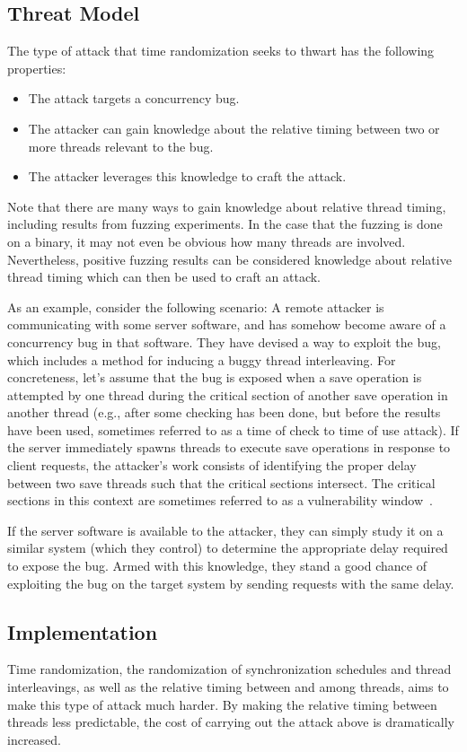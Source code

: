 \subsection{Threat Model}\label{threat-model}
The type of attack that time randomization seeks to thwart has the following properties:
\begin{itemize}
	\item The attack targets a concurrency bug.
	\item The attacker can gain knowledge about the relative timing between two
  or more threads relevant to the bug.
	\item The attacker leverages this knowledge to craft the attack.
\end{itemize}
Note that there are many ways to gain knowledge about relative thread timing, including results from fuzzing experiments.
In the case that the fuzzing is done on a binary, it may not even be obvious how many threads are involved.
Nevertheless, positive fuzzing results can be considered knowledge about relative thread timing which can then be used to craft an attack.

As an example, consider the following scenario:
A remote attacker is communicating with some server software, and has somehow become aware of a concurrency bug in that software.
They have devised a way to exploit the bug, which includes a method for inducing a buggy thread interleaving.
For concreteness, let's assume that the bug is exposed when a save operation
is attempted by one thread during the critical section of another save
operation in another thread (e.g., after some checking has been done, but before the results have been used, sometimes referred to as a time of check to time of use attack).
If the server immediately spawns threads to execute save operations in response to client requests, the attacker's work consists of identifying the proper delay between two save threads such that the critical sections intersect.
The critical sections in this context are sometimes referred to as a vulnerability window~\cite{Yang2012}.

If the server software is available to the attacker, they can simply study it on a similar system (which they control) to determine the appropriate delay required to expose the bug.
Armed with this knowledge, they stand a good chance of exploiting the bug on the target system by sending requests with the same delay.
\subsection{Implementation}\label{implementation}
Time randomization, the randomization of synchronization schedules and thread interleavings, as well as the relative timing between and among threads, aims to make this type of attack much harder.
By making the relative timing between threads less predictable, the cost of carrying out the attack above is dramatically increased.

